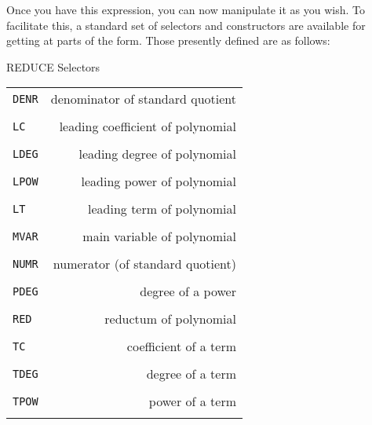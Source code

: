 Once you have this expression, you can now manipulate it as you wish.  To
facilitate this, a standard set of selectors  and
constructors  are available for getting at parts of the
form.  Those presently defined are as follows:

\begin{center}
{\large  REDUCE Selectors}
\end{center}
\begin{center}
\begin{tabular}{l r}
{\tt DENR} & \parbox[t]{\rboxwidth}{denominator of standard quotient} \\ \\

{\tt LC} & \parbox[t]{\rboxwidth}{leading coefficient of polynomial} \\ \\

{\tt LDEG} & \parbox[t]{\rboxwidth}{leading degree of polynomial} \\ \\

{\tt LPOW} & \parbox[t]{\rboxwidth}{leading power of polynomial} \\ \\

{\tt LT} & \parbox[t]{\rboxwidth}{leading term of polynomial} \\ \\

{\tt MVAR} & \parbox[t]{\rboxwidth}{main variable of polynomial} \\ \\

{\tt NUMR} & \parbox[t]{\rboxwidth}{numerator (of standard quotient)} \\ \\

{\tt PDEG} & \parbox[t]{\rboxwidth}{degree of a power} \\ \\

{\tt RED} & \parbox[t]{\rboxwidth}{reductum of polynomial} \\ \\

{\tt TC} & \parbox[t]{\rboxwidth}{coefficient of a term} \\ \\

{\tt TDEG} & \parbox[t]{\rboxwidth}{degree of a term} \\ \\

{\tt TPOW} & \parbox[t]{\rboxwidth}{power of a term} \\ \\
\end{tabular}
\end{center}

